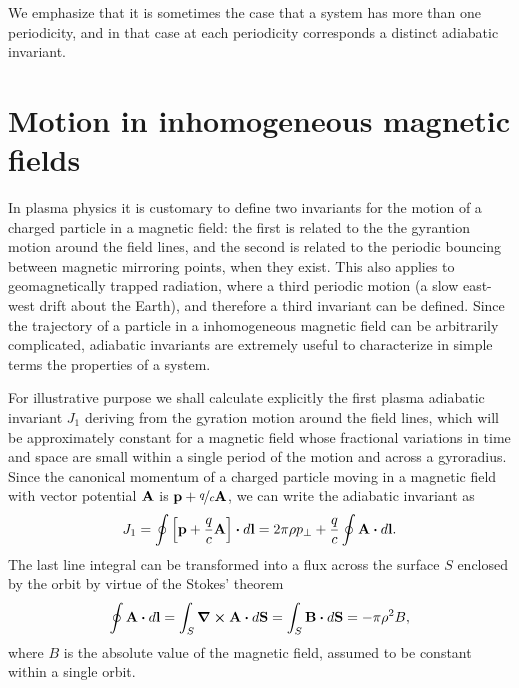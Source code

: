 We emphasize that it is sometimes the case that a system has more than one periodicity,
and in that case at each periodicity corresponds a distinct adiabatic invariant.


\section{Motion in inhomogeneous magnetic fields}

In plasma physics it is customary to define two invariants for the motion of a
charged particle in a magnetic field: the first is related to the the gyrantion
motion around the field lines, and the second is related to the periodic bouncing
between magnetic mirroring points, when they exist. This also applies to geomagnetically
trapped radiation, where a third periodic motion (a slow east-west drift about the Earth),
and therefore a third invariant can be defined. Since the trajectory of a particle
in a inhomogeneous magnetic field can be arbitrarily complicated, adiabatic invariants
are extremely useful to characterize in simple terms the properties of a system.

For illustrative purpose we shall calculate explicitly the first plasma adiabatic
invariant $J_1$ deriving from the gyration motion around the field lines, which
will be approximately constant for a magnetic field whose fractional variations
in time and space are small within a single period of the motion and across a gyroradius.
Since the canonical momentum of a charged particle moving in a magnetic field with
vector potential $\vb{A}$ is $\vb{p} + \nicefrac{q}{c} \vb{A}$, we can write the
adiabatic invariant as
\begin{align}
  J_1 = \oint \qty[\vb{p} + \frac{q}{c} \vb{A}] \dotproduct d\vb{l} =
  2\pi\gyrorad p_\perp + \frac{q}{c} \oint \vb{A} \dotproduct d\vb{l}.
\end{align}
The last line integral can be transformed into a flux across the surface $S$ enclosed
by the orbit by virtue of the Stokes' theorem
\begin{align*}
  \oint \vb{A} \dotproduct d\vb{l} = \int_S \curl{\vb{A}} \dotproduct d\vb{S} =
  \int_S \vb{B} \dotproduct d\vb{S} = -\pi \gyrorad^2 B,
\end{align*}
where $B$ is the absolute value of the magnetic field, assumed to be constant within
a single orbit.

